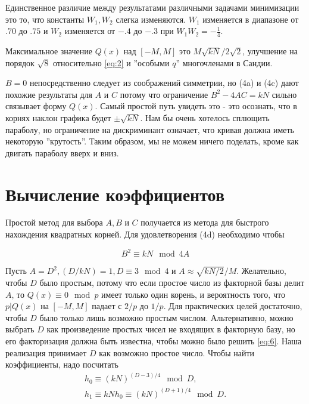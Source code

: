 \documentclass[a4paper,12pt]{report}
\begin{document}
Единственное различие между результатами различными задачами минимизации это то, что константы $W_1, W_2$ слегка изменяются. $W_1$ изменяется в диапазоне от $.70$ до $.75$ и $W_2$  изменяется от $-.4$ до $-.3$ при $W_1W_2 = -\frac{1}{4}$.

Максимальное значение $Q(x)$ над $[-M, M]$ это $M\sqrt{kN}/2\sqrt{2}$, улучшение на порядок $\sqrt{8}$ относительно \eqref{eq:2} и ''особыми $q$'' многочленами в Сандии.

$B = 0$ непосредственно следует из соображений симметрии, но (4a) и (4c) дают похожие результаты для $A$ и $C$ потому что ограничение $B^2 - 4AC = kN$ сильно связывает форму $Q(x)$. Самый простой путь увидеть это - это осознать, что в корнях наклон графика будет $\pm \sqrt{kN}$. Нам бы очень хотелось сплющить параболу, но ограничение на дискриминант означает, что кривая должна иметь некоторую ''крутость''. Таким образом, мы не можем ничего поделать, кроме как двигать параболу вверх и вниз.

\section{Вычисление коэффициентов}

Простой метод для выбора $A, B$ и $C$ получается из метода для быстрого нахождения квадратных корней. Для удовлетворения (4d) необходимо чтобы

\begin{equation}\label{eq:6}
B^2 \equiv kN \mod 4A
\end{equation}

Пусть $A = D^2, (D/kN) = 1, D \equiv 3 \mod 4$ и $A \approx \sqrt{kN/2}/M$. Желательно, чтобы $D$ было простым, потому что если простое число из факторной базы делит $A$, то $Q(x) \equiv 0 \mod p$ имеет только один корень, и вероятность того, что $p | Q(x)$ на $[-M, M]$ падает с $2/p$ до $1/p$. Для практических целей достаточно, чтобы $D$ было только лишь возможно простым числом. Альтернативно, можно выбрать $D$ как произведение простых чисел не входящих в факторную базу, но его факторизация должна быть известна, чтобы можно было решить \eqref{eq:6}. Наша реализация принимает $D$ как возможно простое число. Чтобы найти коэффициенты, надо посчитать
\begin{subequations}
\begin{align}
	h_0 \equiv {(kN)}^{(D-3)/4} \mod D, \label{eq:7a}\\
	h_1 \equiv kNh_0 \equiv (kN)^{(D+1)/4} \mod D. \label{eq:7b}
\end{align}
\label{eq:7all}
\end{subequations}
\end{document}

